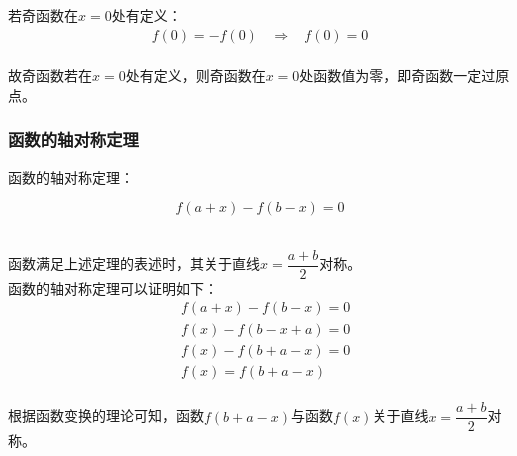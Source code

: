 \documentclass[UTF8]{ctexart}
\begin{document}
    若奇函数在$x=0$处有定义：
    \begin{align}
        f(0)=-f(0)~~~~\Longrightarrow~~~~f(0)=0
    \end{align}\\
    故奇函数若在$x=0$处有定义，则奇函数在$x=0$处函数值为零，即奇函数一定过原点。

\newpage

\subsubsection{函数的轴对称定理}
    \setcounter{equation}{0}
    函数的轴对称定理：
    \begin{large}
        \begin{equation*}
            f(a+x)-f(b-x)=0
        \end{equation*}
    \end{large}\\
    函数满足上述定理的表述时，其关于直线$x=\dfrac{a+b}{2}$对称。\\[3mm]
    函数的轴对称定理可以证明如下：
    \begin{align}
        &f(a+x)-f(b-x)=0\\[2mm]
        &f(x)-f(b-x+a)=0\\[2mm]
        &f(x)-f(b+a-x)=0\\[2mm]
        &f(x)=f(b+a-x)
    \end{align}\\
    根据函数变换的理论可知，函数$f(b+a-x)$与函数$f(x)$关于直线$x=\dfrac{a+b}{2}$对称。
\end{document}
